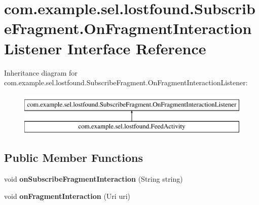 \hypertarget{interfacecom_1_1example_1_1sel_1_1lostfound_1_1SubscribeFragment_1_1OnFragmentInteractionListener}{\section{com.\-example.\-sel.\-lostfound.\-Subscribe\-Fragment.\-On\-Fragment\-Interaction\-Listener \-Interface \-Reference}
\label{interfacecom_1_1example_1_1sel_1_1lostfound_1_1SubscribeFragment_1_1OnFragmentInteractionListener}
}
\-Inheritance diagram for com.\-example.\-sel.\-lostfound.\-Subscribe\-Fragment.\-On\-Fragment\-Interaction\-Listener\-:\begin{figure}[H]
\begin{center}
\leavevmode
\includegraphics[height=2.000000cm]{interfacecom_1_1example_1_1sel_1_1lostfound_1_1SubscribeFragment_1_1OnFragmentInteractionListener}
\end{center}
\end{figure}
\subsection*{\-Public \-Member \-Functions}
\begin{DoxyCompactItemize}
\item 
\hypertarget{interfacecom_1_1example_1_1sel_1_1lostfound_1_1SubscribeFragment_1_1OnFragmentInteractionListener_a49e52bf52ac045228eda481eaa5ad3a3}{void {\bfseries on\-Subscribe\-Fragment\-Interaction} (\-String string)}\label{interfacecom_1_1example_1_1sel_1_1lostfound_1_1SubscribeFragment_1_1OnFragmentInteractionListener_a49e52bf52ac045228eda481eaa5ad3a3}

\item 
\hypertarget{interfacecom_1_1example_1_1sel_1_1lostfound_1_1SubscribeFragment_1_1OnFragmentInteractionListener_a419de726f221023d20f573225984783b}{void {\bfseries on\-Fragment\-Interaction} (\-Uri uri)}\label{interfacecom_1_1example_1_1sel_1_1lostfound_1_1SubscribeFragment_1_1OnFragmentInteractionListener_a419de726f221023d20f573225984783b}

\end{DoxyCompactItemize}


